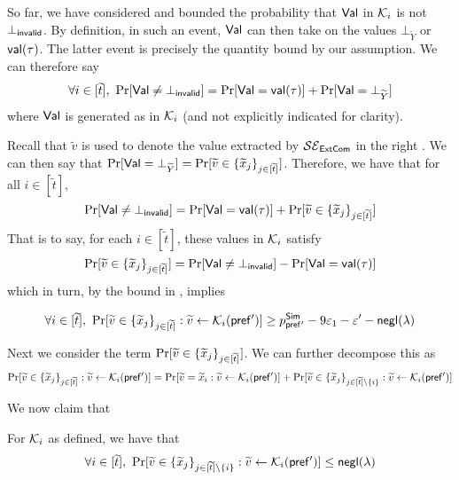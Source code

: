 So far, we have considered and bounded the probability that $\mathsf{Val}$ in $\mathcal{K}_i$ is not $\bot_\mathsf{invalid}$. By definition, in such an event, $\mathsf{Val}$ can then take on the values $\bot_{\tilde{Y}}$ or $\mathsf{val}(\tau)$. The latter event is precisely the quantity bound by our assumption. We can therefore say $$\forall i \in [\widetilde{t}],\ \Pr[\mathsf{Val} \neq \bot_\mathsf{invalid}] = \Pr[\mathsf{Val} = \mathsf{val}(\tau)] + \Pr[\mathsf{Val} = \bot_{\widetilde{Y}}]$$ where $\mathsf{Val}$ is generated as in $\mathcal{K}_i$ (and not explicitly indicated for clarity). 

Recall that $\tilde{v}$ is used to denote the value extracted by $\mathcal{SE}_\mathsf{ExtCom}$ in the right . We can then say that $\Pr[\mathsf{Val} = \bot_{\widetilde{Y}}] = \Pr[\widetilde{v} \in \{\widetilde{x}_j\}_{j \in [\widetilde{t}]}]$. Therefore, we have that for all $i \in [\tilde{t}]$,
$$\Pr[\mathsf{Val} \neq \bot_\mathsf{invalid}] = \Pr[\mathsf{Val} = \mathsf{val}(\tau)] + \Pr[\widetilde{v} \in \{\widetilde{x}_j\}_{j \in [\widetilde{t}]}]$$
That is to say, for each $i \in [\tilde{t}]$, these values in $\mathcal{K}_i$ satisfy $$\Pr[\widetilde{v} \in \{\widetilde{x}_j\}_{j \in [\widetilde{t}]}] = \Pr[\mathsf{Val} \neq \bot_\mathsf{invalid}] - \Pr[\mathsf{Val} = \mathsf{val}(\tau)]$$ 
which in turn, by the bound in , implies 

$$\forall i \in [\widetilde{t}],~\Pr[\widetilde{v} \in \{\widetilde{x}_j\}_{j \in [\widetilde{t}]}: \widetilde{v} \gets \mathcal{K}_i(\mathsf{pref'})] \geq p^{\mathsf{Sim}}_{\mathsf{pref'}} - 9\varepsilon_1 - \varepsilon' - \mathsf{negl}(\lambda)$$

Next we consider the term $\Pr[\widetilde{v} \in \{\widetilde{x}_j\}_{j \in [\widetilde{t}]}]$. We can further decompose this as $$\Pr[\widetilde{v} \in \{\widetilde{x}_j\}_{j \in [\widetilde{t}]}: \widetilde{v} \gets \mathcal{K}_i(\mathsf{pref'})] = \Pr[\widetilde{v} = \widetilde{x}_i: \widetilde{v} \gets \mathcal{K}_i(\mathsf{pref'})] + \Pr[\widetilde{v} \in \{\widetilde{x}_j\}_{j \in [\widetilde{t}] \setminus \{i\}}: \widetilde{v} \gets \mathcal{K}_i(\mathsf{pref'})]$$

We now claim that 

\begin{MyClaim}\label{pq:claim:Ki:vss-hide}
For $\mathcal{K}_i$ as defined, we have that $$\forall i \in [\widetilde{t}],~\Pr[\widetilde{v} \in \{\widetilde{x}_j\}_{j \in [\widetilde{t}] \setminus \{i\}}: \widetilde{v} \gets \mathcal{K}_i(\mathsf{pref'})] \leq \mathsf{negl}(\lambda)$$ 
\end{MyClaim}

